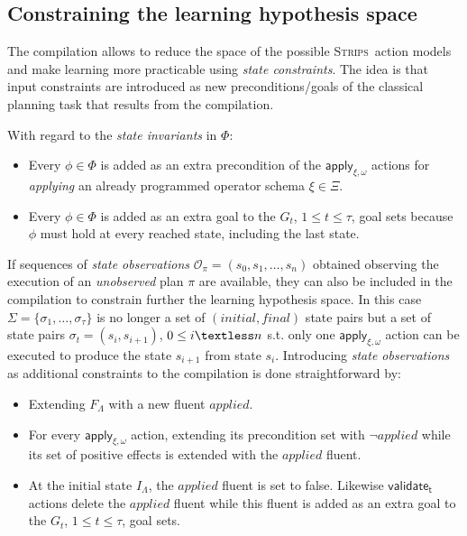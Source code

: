 \documentclass{article}
\newcommand{\strips}{\textsc{Strips}}     %
\begin{document}
\subsection{Constraining the learning hypothesis space}
The compilation allows to reduce the space of the possible \strips\ action models and make learning more practicable using {\em state constraints}. The idea is that input constraints are introduced as new preconditions/goals of the classical planning task that results from the compilation. 

With regard to the {\em state invariants} in $\Phi$:
\begin{itemize}
\item Every $\phi\in\Phi$ is added as an extra precondition of the $\mathsf{apply_{\xi,\omega}}$ actions for {\em applying} an already programmed operator schema $\xi\in\Xi$.
\item Every $\phi\in\Phi$ is added as an extra goal to the $G_{t}$, {\tt\small $1\leq t\leq \tau$}, goal sets because $\phi$ must hold at every reached state, including the last state.
\end{itemize}

If sequences of {\em state observations} $\mathcal{O_{\pi}}=(s_0,s_1,\ldots,s_{n})$ obtained observing the execution of an {\em unobserved} plan $\pi$ are available, they can also be included in the compilation to constrain further the learning hypothesis space. In this case $\Sigma=\{\sigma_1,\ldots,\sigma_{\tau}\}$ is no longer a set of $(initial, final)$ state pairs but a set of state pairs $\sigma_t=(s_{i},s_{i+1})$, {\tt\small $0\leq i \textless n$} s.t. only one $\mathsf{apply_{\xi,\omega}}$ action can be executed to produce the state $s_{i+1}$ from state $s_{i}$. Introducing {\em state observations} as additional constraints to the compilation is done straightforward by:
\begin{itemize}
\item Extending $F_{\Lambda}$ with a new fluent $applied$.
\item For every $\mathsf{apply_{\xi,\omega}}$ action, extending its precondition set with $\neg applied$ while its set of positive effects is extended with the $applied$ fluent.   
\item At the initial state $I_{\Lambda}$, the $applied$ fluent is set to false. Likewise $\mathsf{validate_{t}}$ actions delete the $applied$ fluent while this fluent is added as an extra goal to the $G_{t}$, {\tt\small $1\leq t\leq \tau$}, goal sets.
\end{itemize}
\end{document}
